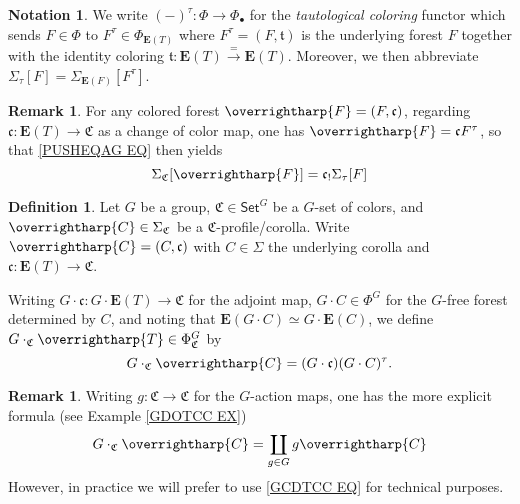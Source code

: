\documentclass[a4paper,10pt
]{article}%
\numberwithin{equation}{section}
\numberwithin{figure}{section}
\theoremstyle{definition} %
\newtheorem{definition}[equation]{Definition}%
\newtheorem{remark}[equation]{Remark}%
\newtheorem{notation}[equation]{Notation}%
\newcommand{\vect}[1]{\text{\overrightharp{\ensuremath{#1}}}}
\newcommand{\1}{\ensuremath{\mathbbm 1}}%
\begin{document}
\begin{notation}
	We write $(-)^{\tau} \colon \Phi \to \Phi_{\bullet}$
	for the \emph{tautological coloring} functor
	which sends $F \in \Phi$ to 
	$F^{\tau} \in \Phi_{\boldsymbol{E}(T)}$
	where
	$F^{\tau} = (F,\mathfrak{t})$ is the underlying forest $F$
	together with the identity coloring
	$\mathfrak{t} \colon \boldsymbol{E}(T) \xrightarrow{=} \boldsymbol{E}(T)$.
	Moreover, we then abbreviate 
	$\Sigma_{\tau}[F] = \Sigma_{\boldsymbol{E}(F)}[F^{\tau}]$.
\end{notation}


\begin{remark}
	For any colored forest $\vect{F}=(F,\mathfrak{c})$,
	regarding $\mathfrak{c} \colon \boldsymbol{E}(T) \to \mathfrak{C}$
	as a change of color map, 
	one has $\vect{F} = \mathfrak{c} F^{\tau}$,
	so that \eqref{PUSHEQAG EQ} then yields 
	\begin{equation}\label{CANPUSH EQ}
	\Sigma_{\mathfrak{C}}[\vect{F}] = 
	\mathfrak{c}_! \Sigma_{\tau}[F]
	\end{equation}
\end{remark}


\begin{definition}
	Let $G$ be a group,
	$\mathfrak{C} \in \mathsf{Set}^G$
	be a $G$-set of colors, 
	and $\vect{C} \in \Sigma_{\mathfrak{C}}$ be a $\mathfrak{C}$-profile/corolla.
	Write
	$\vect{C} = (C,\mathfrak{c})$
	with $C\in \Sigma$ the underlying corolla
	and 
	$\mathfrak{c} \colon \boldsymbol{E}(T) \to \mathfrak{C}$.
	
	Writing 
	$G \cdot \mathfrak{c} \colon G \cdot \boldsymbol{E}(T) \to \mathfrak{C}$
	for the adjoint map, 
	$G \cdot C \in \Phi^G$
	for the $G$-free forest determined by $C$,
	and noting that
	$\boldsymbol{E}(G \cdot C) \simeq 
	G \cdot \boldsymbol{E}(C)$,
	we define $G \cdot_{\mathfrak{C}} \vect{T} \in \Phi^G_{\mathfrak{C}}$ by
	\begin{equation}\label{GCDTCC EQ}
	G \cdot_{\mathfrak{C}} \vect{C} = 
	(G \cdot \mathfrak{c})(G \cdot C)^{\tau}.
	\end{equation}
\end{definition}



\begin{remark}
	Writing $g \colon \mathfrak{C} \to \mathfrak{C}$
	for the $G$-action maps,
	one has the more explicit formula 
	(see Example \ref{GDOTCC EX})
	\[
	G \cdot_{\mathfrak{C}} \vect{C}
	= 
	\coprod_{g \in G}
	g \vect{C}
	\]
	However, in practice we will prefer to use 
	\eqref{GCDTCC EQ} for technical purposes.
\end{remark}
\end{document}
